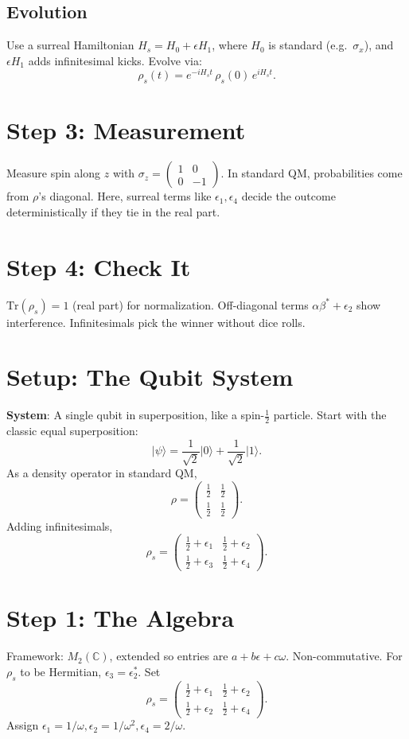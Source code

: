 \documentclass{article}
\begin{document}
\subsection{Evolution}
Use a surreal Hamiltonian \(H_s = H_0 + \epsilon H_1\), where \(H_0\) is standard (e.g.\ \(\sigma_x\)), and \(\epsilon H_1\) adds infinitesimal kicks. Evolve via:
\[
\rho_s(t) = e^{-i H_s t} \, \rho_s(0) \, e^{i H_s t}.
\]

\section{Step 3: Measurement}
Measure spin along \(z\) with \(\sigma_z = \begin{pmatrix} 1 & 0 \\ 0 & -1 \end{pmatrix}\). In standard QM, probabilities come from \(\rho\)'s diagonal. Here, surreal terms like \(\epsilon_1,\epsilon_4\) decide the outcome deterministically if they tie in the real part.

\section{Step 4: Check It}
\(\mathrm{Tr}(\rho_s) = 1\) (real part) for normalization. Off-diagonal terms \(\alpha\beta^* + \epsilon_2\) show interference. Infinitesimals pick the winner without dice rolls.

\section{Setup: The Qubit System}
\textbf{System}: A single qubit in superposition, like a spin-\(\tfrac12\) particle. Start with the classic equal superposition:
\[
\vert \psi \rangle = \frac{1}{\sqrt{2}} \vert 0 \rangle + \frac{1}{\sqrt{2}} \vert 1 \rangle.
\]
As a density operator in standard QM,
\[
\rho = 
\begin{pmatrix}
\tfrac12 & \tfrac12 \\
\tfrac12 & \tfrac12
\end{pmatrix}.
\]
Adding infinitesimals,
\[
\rho_s = 
\begin{pmatrix}
\tfrac12 + \epsilon_1 & \tfrac12 + \epsilon_2 \\
\tfrac12 + \epsilon_3 & \tfrac12 + \epsilon_4
\end{pmatrix}.
\]

\section{Step 1: The Algebra}
Framework: \(M_2(\mathbb{C})\), extended so entries are \(a + b\epsilon + c\omega\). Non-commutative. For \(\rho_s\) to be Hermitian, \(\epsilon_3 = \epsilon_2^*\). Set
\[
\rho_s = 
\begin{pmatrix}
\tfrac12 + \epsilon_1 & \tfrac12 + \epsilon_2 \\
\tfrac12 + \epsilon_2 & \tfrac12 + \epsilon_4
\end{pmatrix}.
\]
Assign \(\epsilon_1 = 1/\omega,\epsilon_2 = 1/\omega^2,\epsilon_4 = 2/\omega\).
\end{document}
